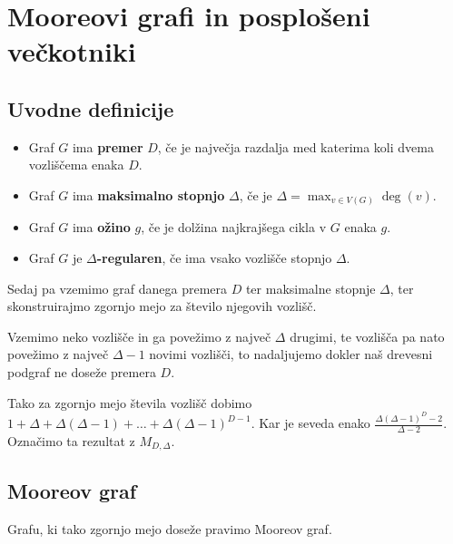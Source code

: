 \documentclass{fmfkpb}
\begin{document}
\makefrontpage
\cleardoublepage

\section{Mooreovi grafi in posplošeni večkotniki}

\subsection{Uvodne definicije}

    \begin{itemize}
        \item[\textbullet] Graf $G$ ima \textbf{premer} $D$, če je največja razdalja med  
        katerima koli dvema vozliščema enaka $D$.
        \item[\textbullet] Graf $G$ ima \textbf{maksimalno stopnjo} $\Delta$, če je
        $\Delta = \max_{v \in V(G)} \deg(v)$.
        \item[\textbullet] Graf $G$ ima \textbf{ožino} $g$, če je dolžina 
        najkrajšega cikla v $G$ enaka $g$.
        \item[\textbullet] Graf $G$ je \textbf{$\Delta$-regularen}, če ima vsako 
        vozlišče stopnjo $\Delta$. 
    \end{itemize}

Sedaj pa vzemimo graf danega premera $D$ 
ter maksimalne stopnje $\Delta$, ter skonstruirajmo zgornjo mejo za število 
njegovih vozlišč. 

Vzemimo neko vozlišče in ga povežimo z največ $\Delta$ drugimi, te 
vozlišča pa nato povežimo z največ $\Delta - 1$ novimi vozlišči, to 
nadaljujemo dokler naš drevesni podgraf ne doseže premera $D$. 

Tako za zgornjo mejo števila vozlišč dobimo
$1 + \Delta + \Delta(\Delta - 1) + \ldots + \Delta(\Delta - 1)^{D - 1}$.
Kar je seveda enako $\frac{\Delta(\Delta - 1)^D - 2}{\Delta - 2}$. Označimo 
ta rezultat z $M_{D, \Delta}$. 

\subsection{Mooreov graf}
Grafu, ki tako zgornjo mejo doseže pravimo Mooreov graf.  
\end{document}
